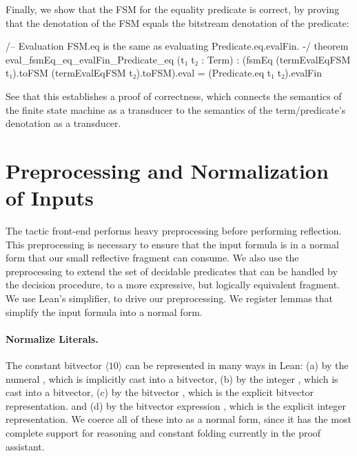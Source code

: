 Finally, we show that the FSM for the equality predicate is correct,
by proving that the denotation of the FSM equals the bitstream denotation of the predicate:

\begin{lean}
/-- Evaluation FSM.eq is the same as evaluating Predicate.eq.evalFin. -/
theorem eval_fsmEq_eq_evalFin_Predicate_eq (t₁ t₂ : Term) :
   (fsmEq (termEvalEqFSM t₁).toFSM (termEvalEqFSM t₂).toFSM).eval =
   (Predicate.eq t₁ t₂).evalFin
\end{lean}

See that this establishes a proof of correctness,
which connects the semantics of the finite state machine as a transducer
to the semantics of the term/predicate's denotation as a transducer.

\section{Preprocessing and Normalization of Inputs}
\label{sec:swbv:preprocessing}

The tactic front-end performs heavy preprocessing before performing reflection.
This preprocessing is necessary to ensure that the input formula is in a normal form that our small reflective fragment can consume.
We also use the preprocessing to extend the set of decidable predicates that can be handled by the decision procedure,
to a more expressive, but logically equivalent fragment.
We use Lean's simplifier,  to drive our preprocessing.
We register lemmas that simplify the input formula into a normal form.

\paragraph{Normalize Literals.}
The constant bitvector $\langle10\rangle$ can be represented in many ways in Lean:
(a) by the numeral , which is implicitly cast into a bitvector,
(b) by the integer , which is cast into a bitvector,
(c) by the bitvector , which is the explicit bitvector representation.
and (d) by the bitvector expression , which is the explicit integer representation.
We coerce all of these into  as a normal form,
since it has the most complete support for reasoning and constant folding currently in the proof assistant.

